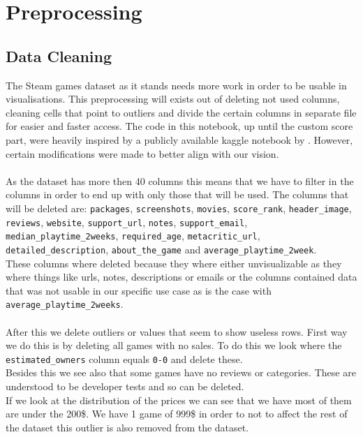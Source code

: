 \documentclass{article}
\begin{document}
	\newpage
	
	\section{Preprocessing}
	
	\subsection{Data Cleaning}
	
	The Steam games dataset as it stands needs more work in order to be usable in visualisations. This preprocessing will exists out of deleting not used columns, cleaning cells that point to outliers and divide the certain columns in separate file for easier and faster access. The code in this notebook, up until the custom score part, were heavily inspired by a publicly available kaggle notebook by \autocite{CLARAMUNT}. However, certain modifications were made to better align with our vision.\\
	\\
	As the dataset has more then 40 columns this means that we have to filter in the columns in order to end up with only those that will be used. The columns that will be deleted are: \texttt{packages}, \texttt{screenshots}, \texttt{movies}, \texttt{score\_rank}, \texttt{header\_image}, \texttt{reviews}, \texttt{website}, \texttt{support\_url}, \texttt{notes}, \texttt{support\_email}, \texttt{median\_playtime\_2weeks}, \texttt{required\_age}, \texttt{metacritic\_url}, \texttt{detailed\_description}, \texttt{about\_the\_game} and \texttt{average\_playtime\_2week}.\\
	These columns where deleted because they where either unvisualizable as they where things like urls, notes, descriptions or emails or the columns contained data that was not usable in our specific use case as is the case with \texttt{average\_playtime\_2weeks}.\\
	\\
	After this we delete outliers or values that seem to show useless rows. First way we do this is by deleting all games with no sales. To do this we look where the \texttt{estimated\_owners} column equals \texttt{0-0} and delete these.\\
	Besides this we see also that some games have no reviews or categories. These are understood to be developer tests and so can be deleted.\\
	If we look at the distribution of the prices we can see that we have most of them are under the 200\$. We have 1 game of 999\$ in order to not to affect the rest of the dataset this outlier is also removed from the dataset.\\
\end{document}
